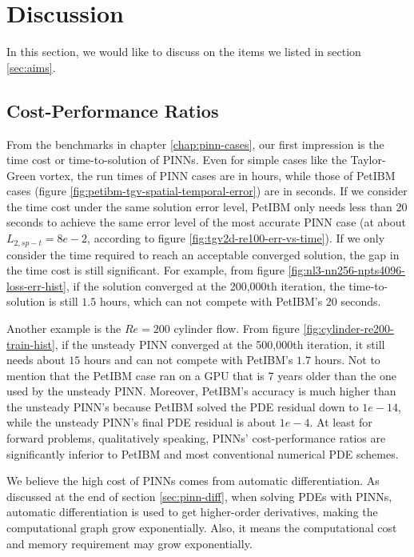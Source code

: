
\section{Discussion}

In this section, we would like to discuss on the items we listed in section \ref{sec:aims}.

\subsection*{Cost-Performance Ratios}

From the benchmarks in chapter \ref{chap:pinn-cases}, our first impression is the time cost or time-to-solution of PINNs.
Even for simple cases like the Taylor-Green vortex, the run times of PINN cases are in hours, while those of PetIBM cases (figure \ref{fig:petibm-tgv-spatial-temporal-error}) are in seconds.
If we consider the time cost under the same solution error level, PetIBM only needs less than 20 seconds to achieve the same error level of the most accurate PINN case (at about $L_{2,sp-t}=8e-2$, according to figure \ref{fig:tgv2d-re100-err-vs-time}).
If we only consider the time required to reach an acceptable converged solution, the gap in the time cost is still significant.
For example, from figure \ref{fig:nl3-nn256-npts4096-loss-err-hist}, if the solution converged at the 200,000th iteration, the time-to-solution is still $1.5$ hours, which can not compete with PetIBM's $20$ seconds.

Another example is the $Re=200$ cylinder flow.
From figure \ref{fig:cylinder-re200-train-hist}, if the unsteady PINN converged at the 500,000th iteration, it still needs about $15$ hours and can not compete with PetIBM's $1.7$ hours.
Not to mention that the PetIBM case ran on a GPU that is 7 years older than the one used by the unsteady PINN.
Moreover, PetIBM's accuracy is much higher than the unsteady PINN's because PetIBM solved the PDE residual down to $1e-14$, while the unsteady PINN's final PDE residual is about $1e-4$.
At least for forward problems, qualitatively speaking, PINNs' cost-performance ratios are significantly inferior to PetIBM and most conventional numerical PDE schemes.

We believe the high cost of PINNs comes from automatic differentiation.
As discussed at the end of section \ref{sec:pinn-diff}, when solving PDEs with PINNs, automatic differentiation is used to get higher-order derivatives, making the computational graph grow exponentially.
Also, it means the computational cost and memory requirement may grow exponentially.

